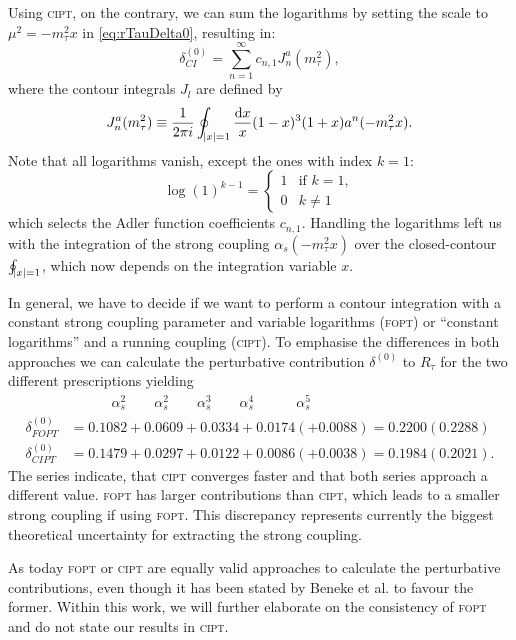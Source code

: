 \documentclass[../../index.tex]{subfiles}
\begin{document}
Using \textsc{cipt}, on the contrary, we can sum the logarithms by setting the
scale to \(\mu^2 = -m_\tau^2 x\) in \cref{eq:rTauDelta0}, resulting in:
\begin{equation}
  \delta^{(0)}_{CI} = \sum_{n=1}^\infty c_{n,1} J_n^a(m_\tau^2),
\end{equation}
where the contour integrals $J_l$ are defined by
\begin{equation}
  J_n^a(m_\tau^2) \equiv \frac{1}{2 \pi i} \oint_{\abs{x}=1} \frac{\dif x}{x} (1-x)^3(1+x) a^n(-m_\tau^2 x).
\end{equation}
Note that all logarithms vanish, except the ones with index \(k=1\):
\begin{equation}
  \log(1)^{k-1} =  \begin{cases} \mbox{1} & \mbox{if } k=1, \\ \mbox{0} & k\neq 1 \end{cases}
\end{equation}
which selects the Adler function coefficients \(c_{n,1}\). Handling the
logarithms left us with the integration of the strong coupling \(\alpha_s(-
m_\tau^2 x)\) over the closed-contour \(\oint_{\abs{x}=1}\), which now depends
on the integration variable \(x\).

In general, we have to decide if we want to perform a contour integration with a
constant strong coupling parameter and variable logarithms (\textsc{fopt}) or
``constant logarithms'' and a running coupling (\textsc{cipt}). To emphasise the
differences in both approaches we can calculate the perturbative contribution
\(\delta^{(0)}\) to \(R_\tau\) for the two different prescriptions yielding
\cite{Beneke2008}
\begin{align}
  & \quad\qquad \alpha_s^2 \qquad \alpha_s^2 \qquad \alpha_s^3 \qquad \alpha_s^4 \quad\qquad \alpha_s^5 \nonumber\\
  \delta_{FOPT}^{(0)} &= 0.1082 + 0.0609 + 0.0334 + 0.0174 (+ 0.0088) = 0.2200 (0.2288) \\
  \delta_{CIPT}^{(0)} &= 0.1479 + 0.0297 + 0.0122 + 0.0086 (+ 0.0038) = 0.1984 (0.2021).
\end{align}
The series indicate, that \textsc{cipt} converges faster and that both series
approach a different value. \textsc{fopt} has larger contributions than
\textsc{cipt}, which leads to a smaller strong coupling if using \textsc{fopt}.
This discrepancy represents currently the biggest theoretical uncertainty for
extracting the strong coupling.

As today \textsc{fopt} or \textsc{cipt} are equally valid approaches to
calculate the perturbative contributions, even though it has been stated by
Beneke et al. \cite{Beneke2008} to favour the former. Within this work, we will
further elaborate on the consistency of \textsc{fopt} and do not state our results
in \textsc{cipt}.
\end{document}
